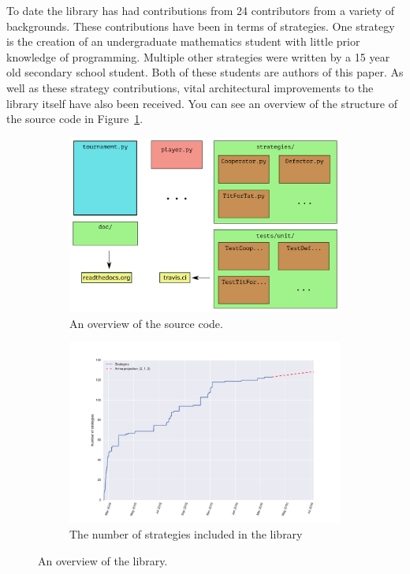 \documentclass{jors}
\begin{document}
To date the library has had contributions from 24 contributors from a variety
of backgrounds. These contributions have been in terms of strategies. One
strategy is the creation of an undergraduate mathematics student with little
prior knowledge of programming. Multiple other strategies were written by a 15
year old secondary school student. Both of these students are authors of this
paper. As well as these strategy contributions, vital architectural
improvements to the library itself have also been received. You can see an
overview of the structure of the source code in Figure~\ref{fig:overview}.

\begin{figure}[!hbtp]
	\begin{subfigure}{.5\textwidth}
		\centering
		\includegraphics[width=.75\textwidth]{../img/outline_of_library.pdf}
		\caption{An overview of the source code.}
		\label{fig:overview}
	\end{subfigure}
	\begin{subfigure}{.5\textwidth}
		\centering
		\includegraphics[width=.9\textwidth]{../img/number_of_strategies_with_arima_projection.pdf}
		\caption{The number of strategies included in the library}
		\label{fig:number_of_strategies_against_date}
	\end{subfigure}
	\caption{An overview of the library.}
\end{figure}
\end{document}
